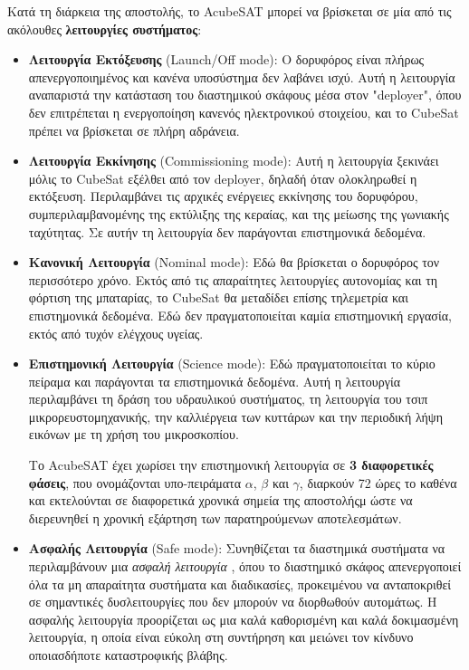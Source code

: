 \documentclass[a4paper,nobib]{tufte-book}
\begin{document}
Κατά τη διάρκεια της αποστολής, το AcubeSAT μπορεί να βρίσκεται σε μία από τις ακόλουθες \textbf{λειτουργίες συστήματος}: \autocite{MDO}
\begin{itemize}
	\item \textbf{Λειτουργία Εκτόξευσης} (Launch/Off mode): Ο δορυφόρος είναι πλήρως απενεργοποιημένος και κανένα υποσύστημα δεν λαβάνει ισχύ. Αυτή η λειτουργία αναπαριστά την κατάσταση του διαστημικού σκάφους μέσα στον "deployer", όπου δεν επιτρέπεται η ενεργοποίηση κανενός ηλεκτρονικού στοιχείου, \autocite[req. 3.3.3]{CDS13} και το CubeSat πρέπει να βρίσκεται σε πλήρη αδράνεια.
	
	\item \textbf{Λειτουργία Εκκίνησης} (Commissioning mode): Αυτή η λειτουργία ξεκινάει μόλις το CubeSat εξέλθει από τον deployer, δηλαδή όταν ολοκληρωθεί η εκτόξευση. Περιλαμβάνει τις αρχικές ενέργειες εκκίνησης του δορυφόρου, συμπεριλαμβανομένης της εκτύλιξης της κεραίας, και της μείωσης της γωνιακής ταχύτητας. Σε αυτήν τη λειτουργία δεν παράγονται επιστημονικά δεδομένα.
	
	\item \textbf{Κανονική Λειτουργία} (Nominal mode): Εδώ θα βρίσκεται ο δορυφόρος τον περισσότερο χρόνο. Εκτός από τις απαραίτητες λειτουργίες αυτονομίας και τη φόρτιση της μπαταρίας, το CubeSat θα μεταδίδει επίσης τηλεμετρία και επιστημονικά δεδομένα. Εδώ δεν πραγματοποιείται καμία επιστημονική εργασία, εκτός από τυχόν ελέγχους υγείας. %
	
	\item \textbf{Επιστημονική Λειτουργία} (Science mode): Εδώ πραγματοποιείται το κύριο πείραμα και παράγονται τα επιστημονικά δεδομένα. Αυτή η λειτουργία περιλαμβάνει τη δράση του υδραυλικού συστήματος, τη λειτουργία του τσιπ μικρορευστομηχανικής, την καλλιέργεια των κυττάρων και την περιοδική λήψη εικόνων με τη χρήση του μικροσκοπίου.
	
	Το AcubeSAT έχει χωρίσει την επιστημονική λειτουργία σε \textbf{3 διαφορετικές φάσεις}, που ονομάζονται υπο-πειράματα \(\alpha\), \(\beta\) και \(\gamma\), διαρκούν 72 ώρες το καθένα και εκτελούνται σε διαφορετικά χρονικά σημεία της αποστολήςμ ώστε να διερευνηθεί η χρονική εξάρτηση των παρατηρούμενων αποτελεσμάτων.
	
	\item \textbf{Ασφαλής Λειτουργία} (Safe mode): Συνηθίζεται τα διαστημικά συστήματα να περιλαμβάνουν μια \emph{ασφαλή λειτουργία} \autocite[385]{aguirre_introduction_space_2013}, όπου το διαστημικό σκάφος απενεργοποιεί όλα τα μη απαραίτητα συστήματα και διαδικασίες, προκειμένου να ανταποκριθεί σε σημαντικές δυσλειτουργίες που δεν μπορούν να διορθωθούν αυτομάτως. Η ασφαλής λειτουργία προορίζεται ως μια καλά καθορισμένη και καλά δοκιμασμένη λειτουργία, η οποία είναι εύκολη στη συντήρηση και μειώνει τον κίνδυνο οποιασδήποτε καταστροφικής βλάβης. 
	\label{itm:safe_mode}
	

\end{itemize}
\end{document}
